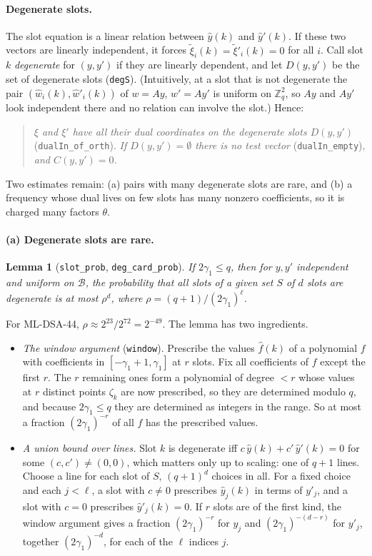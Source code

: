 \documentclass[11pt]{article}
\newtheorem{lemma}[theorem]{Lemma}
\theoremstyle{definition}
\theoremstyle{remark}
\newcommand{\Zq}{\mathbb{Z}_q}
\newcommand{\lean}[1]{\texttt{#1}}
\begin{document}
\paragraph{Degenerate slots.}
The slot equation is a linear relation between $\hat y(k)$ and $\hat y'(k)$. If these two vectors
are linearly independent, it forces $\tilde\xi_i(k)=\tilde\xi'_i(k)=0$ for all $i$. Call slot $k$
\emph{degenerate} for $(y,y')$ if they are linearly dependent, and let $D(y,y')$ be the set of
degenerate slots (\lean{degS}). (Intuitively, at a slot that is not degenerate the pair
$(\hat w_i(k),\hat w'_i(k))$ of $w=Ay$, $w'=Ay'$ is uniform on $\Zq^2$, so $Ay$ and $Ay'$ look
independent there and no relation can involve the slot.) Hence:
\begin{quote}
\emph{$\xi$ and $\xi'$ have all their dual coordinates on the degenerate slots $D(y,y')$}
(\lean{dualIn\_of\_orth}). \emph{If $D(y,y')=\emptyset$ there is no test vector}
(\lean{dualIn\_empty}), \emph{and $C(y,y')=0$.}
\end{quote}
Two estimates remain: (a) pairs with many degenerate slots are rare, and (b) a frequency whose
dual lives on few slots has many nonzero coefficients, so it is charged many factors $\theta$.

\paragraph{(a) Degenerate slots are rare.}
\begin{lemma}[\lean{slot\_prob}, \lean{deg\_card\_prob}]
If $2\gamma_1\le q$, then for $y,y'$ independent and uniform on $\mathcal{B}$, the probability that
all slots of a given set $S$ of $d$ slots are degenerate is at most $\rho^d$, where
$\rho = (q+1)/(2\gamma_1)^\ell$.
\end{lemma}
For ML-DSA-44, $\rho\approx2^{23}/2^{72} = 2^{-49}$. The lemma has two ingredients.
\begin{itemize}
  \item \emph{The window argument} (\lean{window}). Prescribe the values $\hat f(k)$ of a
        polynomial $f$ with coefficients in $[-\gamma_1+1,\gamma_1]$ at $r$ slots. Fix all
        coefficients of $f$ except the first $r$. The $r$ remaining ones form a polynomial of
        degree $<r$ whose values at $r$ distinct points $\zeta_k$ are now prescribed, so they are
        determined modulo $q$, and because $2\gamma_1\le q$ they are determined as integers in the
        range. So at most a fraction $(2\gamma_1)^{-r}$ of all $f$ has the prescribed values.
  \item \emph{A union bound over lines.} Slot $k$ is degenerate iff
        $c\,\hat y(k) + c'\,\hat y'(k) = 0$ for some $(c,c')\ne(0,0)$, which matters only up to
        scaling: one of $q+1$ lines. Choose a line for each slot of $S$, $(q+1)^d$ choices in
        all. For a fixed choice and each $j<\ell$, a slot with $c\ne0$ prescribes
        $\hat y_j(k)$ in terms of $y'_j$, and a slot with $c=0$ prescribes $\hat y'_j(k)=0$. If
        $r$ slots are of the first kind, the window argument gives a fraction
        $(2\gamma_1)^{-r}$ for $y_j$ and $(2\gamma_1)^{-(d-r)}$ for $y'_j$, together
        $(2\gamma_1)^{-d}$, for each of the $\ell$ indices $j$.
\end{itemize}
\end{document}
